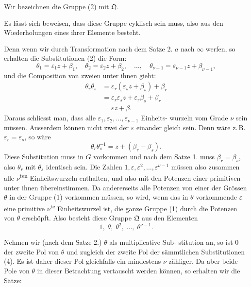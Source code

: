 \documentclass[12pt,a4paper]{article}
\theoremstyle{plain}
\theoremstyle{definition}
\theoremstyle{remark}
\begin{document}
Wir bezeichnen die Gruppe (2) mit $\mathfrak{Q}$.

Es l\"asst sich beweisen, dass diese Gruppe cyklisch sein muss,
also aus den Wiederholungen eines ihrer Elemente besteht.

Denn wenn wir durch Transformation nach dem Satze 2.
$a$ nach $\infty$ werfen, so erhalten die Substitutionen (2) die Form:
\[
\theta_1 = \varepsilon_1 z + \beta_1,\quad \theta_2 = \varepsilon_2 z + \beta_2,\quad \ldots,\quad
\theta_{\nu-1} = \varepsilon_{\nu-1}z + \beta_{\nu-1},
\]
und die Composition von zweien unter ihnen giebt:
\begin{align*}
\theta_r\theta_s &= \varepsilon_r(\varepsilon_s z + \beta_s) + \beta_r\\
&= \varepsilon_r\varepsilon_s z + \varepsilon_r\beta_s + \beta_r\\
&= \varepsilon z + \beta.
\end{align*}
Daraus schliesst man, dass alle $\varepsilon_1, \varepsilon_2, \ldots, \varepsilon_{\nu-1}$ Einheits-
wurzeln vom Grade $\nu$ sein m\"ussen. Ausserdem k\"onnen nicht zwei
der $\varepsilon$ einander gleich sein. Denn w\"are z.\,B. $\varepsilon_r = \varepsilon_s$, so w\"are
\[
\theta_r\theta_s^{-1} = z + (\beta_r - \beta_s).
\]
Diese Substitution muss in $G$ vorkommen und nach dem
Satze 1. muss $\beta_r = \beta_s$, also $\theta_r$ mit $\theta_s$ identisch sein. Die Zahlen
$1, \varepsilon, \varepsilon^2, \ldots, \varepsilon^{\nu-1}$ m\"ussen also zusammen alle $\nu$\textsuperscript{ten} Einheitswurzeln
enthalten, und also mit den Potenzen einer primitiven unter
ihnen \"ubereinstimmen. Da andererseits alle Potenzen von einer
der Gr\"ossen $\theta$ in der Gruppe (1) vorkommen m\"ussen, so wird,
wenn das in $\theta$ vorkommende $\varepsilon$ eine primitive $\nu$\textsuperscript{te} Einheitswurzel
ist, die ganze Gruppe (1) durch die Potenzen von $\theta$ ersch\"opft.
Also besteht diese Gruppe $\mathfrak{Q}$ aus den Elementen
\begin{equation}\label{eq:52_4}
1,\; \theta,\; \theta^2,\; \ldots,\; \theta^{\nu-1}.\tag{4}
\end{equation}

Nehmen wir (nach dem Satze 2.) $\theta$ als multiplicative Sub-
stitution an, so ist $0$ der zweite Pol von $\theta$ und zugleich der
zweite Pol der s\"ammtlichen Substitutionen (4). Es ist daher
dieser Pol gleichfalls ein mindestens $\nu$-z\"ahliger. Da aber beide
Pole von $\theta$ in dieser Betrachtung vertauscht werden k\"onnen,
so erhalten wir die S\"atze:
\end{document}

